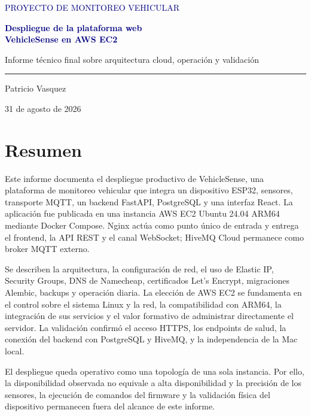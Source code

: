 \documentclass[12pt,a4paper,oneside]{report}
\begin{document}
\begin{titlepage}
  \thispagestyle{empty}
  \vspace*{1.4cm}
  \begin{center}
    {\Large\textcolor{navy}{PROYECTO DE MONITOREO VEHICULAR}}\\[1.2cm]
    {\Huge\bfseries\textcolor{navy}{Despliegue de la plataforma web\\
    VehicleSense en AWS EC2}\par}
    \vspace{0.7cm}
    {\large Informe técnico final sobre arquitectura cloud, operación y validación}\par
    \vfill
    \rule{0.72\textwidth}{0.8pt}\par
    \vspace{0.35cm}
    {\large Patricio Vasquez}\par
    \vspace{0.25cm}
    {\large 31 de agosto de 2026}
  \end{center}
\end{titlepage}

\chapter*{Resumen}

Este informe documenta el despliegue productivo de VehicleSense, una plataforma de
monitoreo vehicular que integra un dispositivo ESP32, sensores, transporte MQTT,
un backend FastAPI, PostgreSQL y una interfaz React. La aplicación fue publicada
en una instancia AWS EC2 Ubuntu 24.04 ARM64 mediante Docker Compose. Nginx actúa
como punto único de entrada y entrega el frontend, la API REST y el canal
WebSocket; HiveMQ Cloud permanece como broker MQTT externo.

Se describen la arquitectura, la configuración de red, el uso de Elastic IP,
Security Groups, DNS de Namecheap, certificados Let's Encrypt, migraciones
Alembic, backups y operación diaria. La elección de AWS EC2 se fundamenta en el
control sobre el sistema Linux y la red, la compatibilidad con ARM64, la
integración de sus servicios y el valor formativo de administrar directamente el
servidor. La validación confirmó el acceso HTTPS, los endpoints de salud, la
conexión del backend con PostgreSQL y HiveMQ, y la independencia de la Mac local.

El despliegue queda operativo como una topología de una sola instancia. Por ello,
la disponibilidad observada no equivale a alta disponibilidad y la precisión de
los sensores, la ejecución de comandos del firmware y la validación física del
dispositivo permanecen fuera del alcance de este informe.
\end{document}
